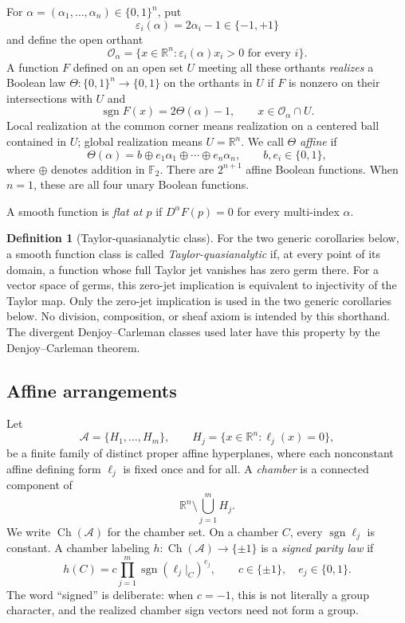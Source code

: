\documentclass[11pt]{article}
\theoremstyle{definition}
\newtheorem{definition}[theorem]{Definition}
\theoremstyle{remark}
\newcommand{\R}{\mathbb{R}}
\newcommand{\Ftwo}{\mathbb{F}_2}
\newcommand{\bits}{\{0,1\}}
\newcommand{\sign}{\operatorname{sgn}}
\newcommand{\Ch}{\operatorname{Ch}}
\newcommand{\eps}{\varepsilon}
\newcommand{\cA}{\mathcal{A}}
\begin{document}
For $\alpha=(\alpha_1,\dots,\alpha_n)\in\bits^n$, put
\[
 \eps_i(\alpha)=2\alpha_i-1\in\{-1,+1\}
\]
and define the open orthant
\[
 \mathcal{O}_\alpha
 =\{x\in\R^n:\eps_i(\alpha)x_i>0\text{ for every }i\}.
\]
A function $F$ defined on an open set $U$ meeting all these orthants \emph{realizes} a Boolean law $\Theta:\bits^n\to\bits$ on the orthants in $U$ if $F$ is nonzero on their intersections with $U$ and
\[
 \sign F(x)=2\Theta(\alpha)-1,
 \qquad x\in\mathcal{O}_\alpha\cap U.
\]
Local realization at the common corner means realization on a centered ball contained in $U$; global realization means $U=\R^n$. We call $\Theta$ \emph{affine} if
\[
 \Theta(\alpha)=b\oplus e_1\alpha_1\oplus\cdots\oplus e_n\alpha_n,
 \qquad b,e_i\in\bits,
\]
where $\oplus$ denotes addition in $\Ftwo$. There are $2^{n+1}$ affine Boolean functions. When $n=1$, these are all four unary Boolean functions.

A smooth function is \emph{flat at $p$} if $D^\alpha F(p)=0$ for every multi-index $\alpha$.

\begin{definition}[Taylor-quasianalytic class]\label{def:taylorquasi}
For the two generic corollaries below, a smooth function class is called \emph{Taylor-quasianalytic} if, at every point of its domain, a function whose full Taylor jet vanishes has zero germ there. For a vector space of germs, this zero-jet implication is equivalent to injectivity of the Taylor map. Only the zero-jet implication is used in the two generic corollaries below. No division, composition, or sheaf axiom is intended by this shorthand. The divergent Denjoy--Carleman classes used later have this property by the Denjoy--Carleman theorem.
\end{definition}

\subsection{Affine arrangements}

Let
\[
 \cA=\{H_1,\dots,H_m\},\qquad H_j=\{x\in\R^n:\ell_j(x)=0\},
\]
be a finite family of distinct proper affine hyperplanes, where each nonconstant affine defining form $\ell_j$ is fixed once and for all. A \emph{chamber} is a connected component of
\[
 \R^n\setminus\bigcup_{j=1}^m H_j.
\]
We write $\Ch(\cA)$ for the chamber set. On a chamber $C$, every $\sign\ell_j$ is constant. A chamber labeling $h:\Ch(\cA)\to\{\pm1\}$ is a \emph{signed parity law} if
\begin{equation}\label{eq:signed-parity}
 h(C)=c\prod_{j=1}^m \sign(\ell_j|_C)^{e_j},
 \qquad c\in\{\pm1\},\quad e_j\in\bits.
\end{equation}
The word ``signed'' is deliberate: when $c=-1$, this is not literally a group character, and the realized chamber sign vectors need not form a group.
\end{document}

